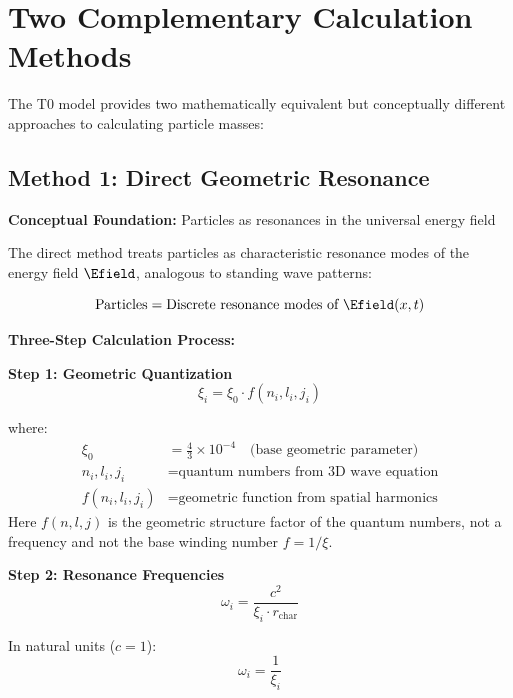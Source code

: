 	\section{Two Complementary Calculation Methods}
	\label{sec:two_calculation_methods}
	
	The T0 model provides two mathematically equivalent but conceptually different approaches to calculating particle masses:
	
	\subsection{Method 1: Direct Geometric Resonance}
	\label{subsec:direct_geometric_method}
	
	\textbf{Conceptual Foundation:} Particles as resonances in the universal energy field
	
	The direct method treats particles as characteristic resonance modes of the energy field $\Efield$, analogous to standing wave patterns:
	
	\begin{equation}
		\text{Particles} = \text{Discrete resonance modes of } \Efield(x,t)
	\end{equation}
	
	\textbf{Three-Step Calculation Process:}
	
	\textbf{Step 1: Geometric Quantization}
	\begin{equation}
		\xi_i = \xi_0 \cdot f(n_i, l_i, j_i)
		\label{eq:geometric_quantization}
	\end{equation}

	where:
	\begin{align}
		\xi_0 &= \frac{4}{3} \times 10^{-4} \quad \text{(base geometric parameter)} \\
		n_i, l_i, j_i &= \text{quantum numbers from 3D wave equation} \\
		f(n_i, l_i, j_i) &= \text{geometric function from spatial harmonics}
	\end{align}
	Here $f(n,l,j)$ is the geometric structure factor of the quantum numbers, not a frequency and not the base winding number $f = 1/\xi$.
	
	\textbf{Step 2: Resonance Frequencies}
	\begin{equation}
		\omega_i = \frac{c^2}{\xi_i \cdot r_{\text{char}}}
		\label{eq:resonance_frequencies}
	\end{equation}
	
	In natural units ($c = 1$):
	\begin{equation}
		\omega_i = \frac{1}{\xi_i}
	\end{equation}
	
